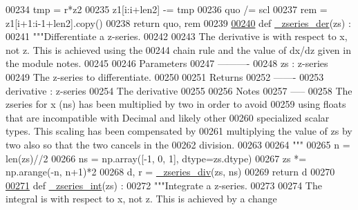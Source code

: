 \begin{DoxyCode}
00234         tmp = r*z2
00235         z1[i:i+len2] -= tmp
00236         quo /= scl
00237         rem = z1[i+1:i-1+len2].copy()
00238         \textcolor{keywordflow}{return} quo, rem
00239 
\hypertarget{chebyshev_8py_source_l00240}{}\hyperlink{namespacepyneb_1_1utils_1_1chebyshev_adb39b6e9d3aba3bf3784a3364ec3e6ca}{00240} \textcolor{keyword}{def }\hyperlink{namespacepyneb_1_1utils_1_1chebyshev_adb39b6e9d3aba3bf3784a3364ec3e6ca}{\_zseries\_der}(zs) :
00241     \textcolor{stringliteral}{"""Differentiate a z-series.}
00242 \textcolor{stringliteral}{}
00243 \textcolor{stringliteral}{    The derivative is with respect to x, not z. This is achieved using the}
00244 \textcolor{stringliteral}{    chain rule and the value of dx/dz given in the module notes.}
00245 \textcolor{stringliteral}{}
00246 \textcolor{stringliteral}{    Parameters}
00247 \textcolor{stringliteral}{    ----------}
00248 \textcolor{stringliteral}{    zs : z-series}
00249 \textcolor{stringliteral}{        The z-series to differentiate.}
00250 \textcolor{stringliteral}{}
00251 \textcolor{stringliteral}{    Returns}
00252 \textcolor{stringliteral}{    -------}
00253 \textcolor{stringliteral}{    derivative : z-series}
00254 \textcolor{stringliteral}{        The derivative}
00255 \textcolor{stringliteral}{}
00256 \textcolor{stringliteral}{    Notes}
00257 \textcolor{stringliteral}{    -----}
00258 \textcolor{stringliteral}{    The zseries for x (ns) has been multiplied by two in order to avoid}
00259 \textcolor{stringliteral}{    using floats that are incompatible with Decimal and likely other}
00260 \textcolor{stringliteral}{    specialized scalar types. This scaling has been compensated by}
00261 \textcolor{stringliteral}{    multiplying the value of zs by two also so that the two cancels in the}
00262 \textcolor{stringliteral}{    division.}
00263 \textcolor{stringliteral}{}
00264 \textcolor{stringliteral}{    """}
00265     n = len(zs)//2
00266     ns = np.array([-1, 0, 1], dtype=zs.dtype)
00267     zs *= np.arange(-n, n+1)*2
00268     d, r = \hyperlink{namespacepyneb_1_1utils_1_1chebyshev_ad00f2653194746fa98c3421eb7c26f2c}{\_zseries\_div}(zs, ns)
00269     \textcolor{keywordflow}{return} d
00270 
\hypertarget{chebyshev_8py_source_l00271}{}\hyperlink{namespacepyneb_1_1utils_1_1chebyshev_a39d3ae73408fcde399d87f5cfd5e7c98}{00271} \textcolor{keyword}{def }\hyperlink{namespacepyneb_1_1utils_1_1chebyshev_a39d3ae73408fcde399d87f5cfd5e7c98}{\_zseries\_int}(zs) :
00272     \textcolor{stringliteral}{"""Integrate a z-series.}
00273 \textcolor{stringliteral}{}
00274 \textcolor{stringliteral}{    The integral is with respect to x, not z. This is achieved by a change}

\end{DoxyCode}
